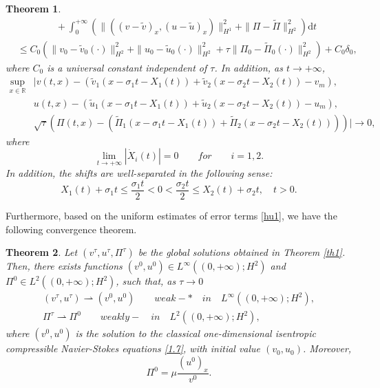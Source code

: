\documentclass[10pt,reqno]{amsart}
\numberwithin{equation}{section}
\newtheorem{theorem}{Theorem}[section]
\newcommand{\dif}{\mathrm{d}}
\begin{document}
\begin{theorem}
\begin{equation}
\begin{aligned}
&\qquad\qquad+\int_0^{+\infty}\left(\|\left((v-\widetilde{v})_{x}, (u-\widetilde{u})_{x}\right)\|^2_{H^1}+\|\Pi-\widetilde{\Pi}\|^2_{H^2}\right)\dif t\\
&\leq C_0\left(\|v_0-\widetilde{v}_0(\cdot)\|^2_{H^2}+\|u_0-\widetilde{u}_0(\cdot)\|^2_{H^2}
+\tau\|\Pi_0-\widetilde{\Pi}_0(\cdot)\|^2_{H^2}\right)+C_0\delta_0,
\end{aligned}
\end{equation}
where $C_0$ is a universal constant independent of  $\tau$.
In addition, as $t\rightarrow+\infty$,
\begin{equation}\label{1.10}
\begin{aligned}
\sup\limits_{x\in\mathbb{ R}}&\Big|v(t,x)-\left(\widetilde{v}_1(x-\sigma_1 t-X_1(t))+\widetilde{v}_2(x-\sigma_2 t-X_2(t))-v_m\right),\\
&u(t,x)-\left(\widetilde{u}_1(x-\sigma_1 t-X_1(t))+\widetilde{u}_2(x-\sigma_2 t-X_2(t))-u_m\right),\\
&\sqrt{\tau}\left(\Pi(t,x)-\left(\widetilde{\Pi}_1(x-\sigma_1 t-X_1(t))+\widetilde{\Pi}_2(x-\sigma_2 t-X_2(t))\right)\right)\Big|
 \rightarrow0,
\end{aligned}
\end{equation}
where
\begin{equation}\label{1.11}
\lim\limits_{t\rightarrow+\infty}|\dot{X}_i(t)|=0 \qquad for \qquad i=1,2.
\end{equation}
In addition, the shifts are well-separated in the following sense:
\begin{equation}\label{1.12}
X_1(t)+\sigma_1 t\le \frac{\sigma_1 t}{2}< 0< \frac{\sigma_2 t}{2}\le X_2(t)+\sigma_2 t,\quad t>0.
\end{equation}
\end{theorem}

Furthermore, based on the uniform estimates of error terms \eqref{hu1}, we have the following convergence theorem.
\begin{theorem}\label{th1.2}
Let $(v^{\tau}, u^{\tau}, \Pi^{\tau})$ be the global solutions obtained in Theorem \ref{th1}. Then, there exists functions $(v^0 ,u^0)\in L^{\infty}\left((0, +\infty);H^2\right)$ and $\Pi^0\in L^2\left((0, +\infty);H^2\right)$, such that, as $\tau\rightarrow0$
\begin{align*}
(v^{\tau}, u^{\tau})\rightharpoonup (v^0, u^0) \qquad weak-*\quad in \quad L^{\infty}\left((0, +\infty);H^2\right),\\
\Pi^{\tau}\rightharpoonup \Pi^0 \qquad weakly- \quad in \quad L^2\left((0, +\infty);H^2\right),
\end{align*}
where $(v^0, u^0)$ is the solution to the classical one-dimensional isentropic compressible Navier-Stokes equations \eqref{1.7}, with initial value $(v_0, u_0)$. Moreover,
\[
\Pi^0=\mu\frac{(u^0)_{x}}{v^0}.
\]
\end{theorem}
\end{document}
